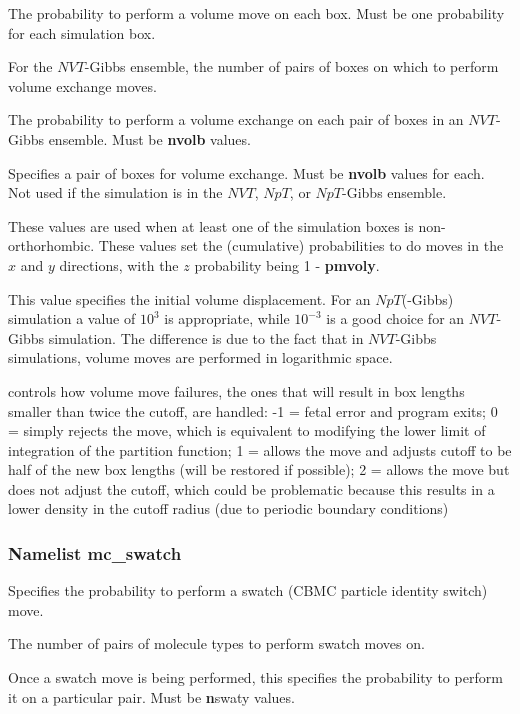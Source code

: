 \documentclass[12pt,letterpaper]{article}
\begin{document}
 The probability to perform a volume
move on each box. Must be one probability for each
simulation box.

 For the $NVT$-Gibbs ensemble, the
number of pairs of boxes on which to perform volume exchange
moves.

 The probability to perform a volume
exchange on each pair of boxes in an $NVT$-Gibbs ensemble.
Must be {\bf nvolb} values.

 Specifies a pair of boxes for
volume exchange. Must be {\bf nvolb} values for each. Not
used if the simulation is in the $NVT$, $NpT$, or
$NpT$-Gibbs ensemble.

 These values are used when at
least one of the simulation boxes is non-orthorhombic. These
values set the (cumulative) probabilities to do moves in the
$x$ and $y$ directions, with the $z$ probability being 1 -
{\bf pmvoly}.

 This value specifies the initial
volume displacement. For an $NpT$(-Gibbs) simulation a value
of $10^3$ is appropriate, while $10^{-3}$ is a good choice
for an $NVT$-Gibbs simulation. The difference is due to the
fact that in $NVT$-Gibbs simulations, volume moves are
performed in logarithmic space.

 controls how volume
move failures, the ones that will result in box lengths
smaller than twice the cutoff, are handled: -1 = fetal error
and program exits; 0 = simply rejects the move, which is
equivalent to modifying the lower limit of integration of
the partition function; 1 = allows the move and adjusts
cutoff to be half of the new box lengths (will be restored
if possible); 2 = allows the move but does not adjust the
cutoff, which could be problematic because this results in a
lower density in the cutoff radius (due to periodic boundary
conditions)

\subsubsection{Namelist \textbf{mc\_swatch}}
 Specifies the probability to perform
a swatch (CBMC particle identity switch) move.

 The number of pairs of molecule types
to perform swatch moves on.

 Once a swatch move is being
performed, this specifies the probability to perform it on a
particular pair. Must be {\textbf nswaty} values.
\end{document}
